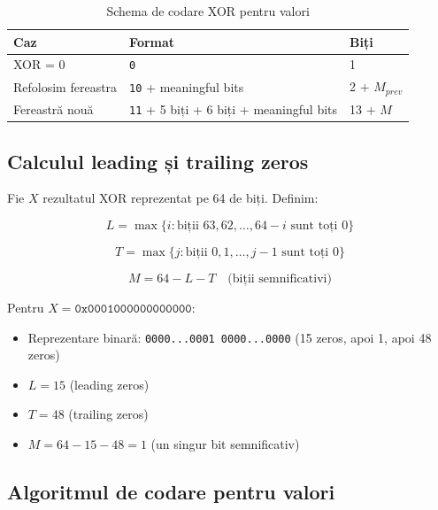 \begin{table}[h]
\centering
\begin{tabular}{@{}lll@{}}
\toprule
\textbf{Caz} & \textbf{Format} & \textbf{Biți} \\
\midrule
XOR = 0 & \texttt{0} & 1 \\
Refolosim fereastra & \texttt{10} + meaningful bits & 2 + $M_{prev}$ \\
Fereastră nouă & \texttt{11} + 5 biți + 6 biți + meaningful bits & 13 + $M$ \\
\bottomrule
\end{tabular}
\caption{Schema de codare XOR pentru valori}
\label{tab:xor-encoding}
\end{table}

\subsection{Calculul leading și trailing zeros}

Fie $X$ rezultatul XOR reprezentat pe 64 de biți. Definim:

\begin{equation}
    L = \max\{i : \text{biții } 63, 62, \ldots, 64-i \text{ sunt toți } 0\}
\end{equation}

\begin{equation}
    T = \max\{j : \text{biții } 0, 1, \ldots, j-1 \text{ sunt toți } 0\}
\end{equation}

\begin{equation}
    M = 64 - L - T \quad \text{(biții semnificativi)}
\end{equation}

\begin{example}
Pentru $X = \texttt{0x0001000000000000}$:
\begin{itemize}
    \item Reprezentare binară: \texttt{0000...0001 0000...0000} (15 zeros, apoi 1, apoi 48 zeros)
    \item $L = 15$ (leading zeros)
    \item $T = 48$ (trailing zeros)
    \item $M = 64 - 15 - 48 = 1$ (un singur bit semnificativ)
\end{itemize}
\end{example}

\subsection{Algoritmul de codare pentru valori}

